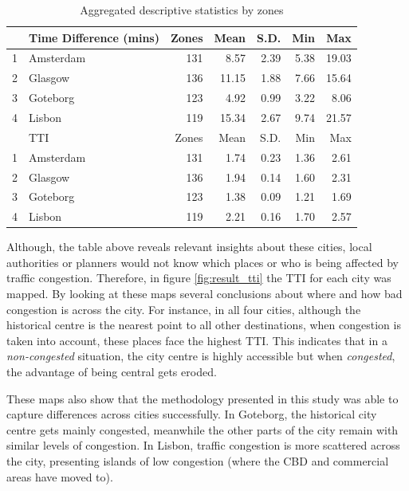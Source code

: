 \documentclass[a4paper]{jpconf}
\begin{document}
\begin{table}[ht]		
	\centering
	\begin{tabular}{rlrrrrr}
		\hline
		  & Time Difference (mins) & Zones & Mean & S.D. & Min & Max \\ 
		\hline
		1 & Amsterdam 	& 131 	& 8.57  & 2.39 & 5.38 & 19.03 \\ 
		2 & Glasgow 	& 136 	& 11.15 & 1.88 & 7.66 & 15.64 \\ 
		3 & Goteborg 	& 123 	& 4.92  & 0.99 & 3.22 & 8.06  \\ 
		4 & Lisbon 		& 119 	& 15.34 & 2.67 & 9.74 & 21.57 \\ 
		
		\hline
		  & TTI	& Zones & Mean & S.D. & Min & Max \\ 
		\hline
		1 & Amsterdam 	& 131 & 1.74 & 0.23 & 1.36 & 2.61 \\ 
		2 & Glasgow 	& 136 & 1.94 & 0.14 & 1.60 & 2.31 \\ 
		3 & Goteborg	& 123 & 1.38 & 0.09 & 1.21 & 1.69 \\ 
		4 & Lisbon 		& 119 & 2.21 & 0.16 & 1.70 & 2.57 \\ 
		\hline
	\end{tabular}
	\caption {Aggregated descriptive statistics by zones}
	\label{tab:Results_grids}
\end{table}

\indent Although, the table above reveals relevant insights about these cities, local authorities or planners would not know which places or who is being affected by traffic congestion. Therefore, in figure \ref{fig:result_tti} the TTI for each city was mapped. By looking at these maps several conclusions about where and how bad congestion is across the city. For instance, in all four cities, although the historical centre is the nearest point to all other destinations, when congestion is taken into account, these places face the highest TTI. This indicates that in a \textit{non-congested} situation, the city centre is highly accessible but when \textit{congested}, the advantage of being central gets eroded. \par
\indent These maps also show that the methodology presented in this study 
was able to capture differences across cities successfully. In Goteborg, the historical city centre gets mainly congested, meanwhile the other parts of the city remain with similar levels of congestion. In Lisbon, traffic congestion is more scattered across the city, presenting islands of low congestion (where the CBD and commercial areas have moved to).
\end{document}
